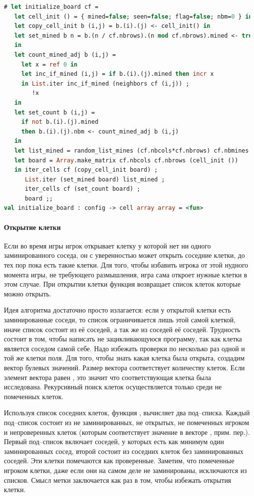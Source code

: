 \begin{lstlisting}[language=OCaml]
# let initialize_board cf = 
   let cell_init () = { mined=false; seen=false; flag=false; nbm=0 } in 
   let copy_cell_init b (i,j) = b.(i).(j) <- cell_init() in
   let set_mined b n = b.(n / cf.nbrows).(n mod cf.nbrows).mined <- true
   in
   let count_mined_adj b (i,j) =
     let x = ref 0 in
     let inc_if_mined (i,j) = if b.(i).(j).mined then incr x 
     in List.iter inc_if_mined (neighbors cf (i,j)) ;
        !x
   in
   let set_count b (i,j) =
     if not b.(i).(j).mined 
     then b.(i).(j).nbm <- count_mined_adj b (i,j)
   in
   let list_mined = random_list_mines (cf.nbcols*cf.nbrows) cf.nbmines in 
   let board = Array.make_matrix cf.nbcols cf.nbrows (cell_init ()) 
   in iter_cells cf (copy_cell_init board) ;
      List.iter (set_mined board) list_mined ;
      iter_cells cf (set_count board) ;
      board ;;
val initialize_board : config -> cell array array = <fun>
\end{lstlisting}

\paragraph{Открытие клетки}

Если во время игры игрок открывает клетку у которой нет ни одного 
заминированного соседа, он с уверенностью может открыть соседние клетки, до тех 
пор пока есть такие клетки. Для того, чтобы избавить игрока от этой нудного 
момента игры, не требующего размышления, игра сама откроет нужные клетки в этом 
случае. При открытии клетки функция  возвращает список 
клеток которые можно открыть.

Идея алгоритма достаточно просто излагается: если у открытой клетки есть 
заминированные соседи, то список ограничивается лишь этой самой клеткой, иначе 
список состоит из её соседей, а так же из соседей её соседей. Трудность состоит 
в том, чтобы написать не зацикливающуюся программу, так как клетка является 
соседом самой себе. Надо избежать проверки по несколько раз одной и той же 
клетки поля. Для того, чтобы знать какая клетка была открыта, создадим вектор 
 булевых значений. Размер вектора соответствует количеству 
клеток. Если элемент вектора равен , это значит что соответствующая 
клетка была исследована. Рекурсивный поиск клеток осуществляется только среди 
не помеченных клеток.

Используя список соседних клеток, функция , вычисляет два 
под--списка. Каждый под--список состоит из не заминированных, не открытых, не 
помеченных игроком и непроверенных клеток (которым соответствует значение 
 в векторе , прим. пер.). Первый под--список включает 
соседей, у которых есть как минимум один заминированных сосед, второй состоит 
из соседних клеток без заминированных соседей. Эти клетки помечаются как 
проверенные. Заметим, что помеченные игроком клетки, даже если они на самом 
деле не заминированы, исключаются из списков. Смысл метки заключается как раз в 
том, чтобы избежать открытия клетки.

